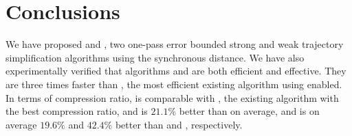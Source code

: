 \section{Conclusions} %

We have proposed \cist and \cista, two one-pass error bounded strong and weak trajectory simplification algorithms using the  synchronous distance.
We have also experimentally verified that algorithms \cist and \cista are both efficient and effective.
They are three times faster than \squishe, the most efficient existing \lsa algorithm using \sed enabled.
In terms of compression ratio, \cist is {comparable} with \dpa, the existing \lsa algorithm with the best compression ratio, and is $21.1\%$ better than \squishe on average, and \cista is on average $19.6\%$ and $42.4\%$ better than \dps and \squishe, respectively.
